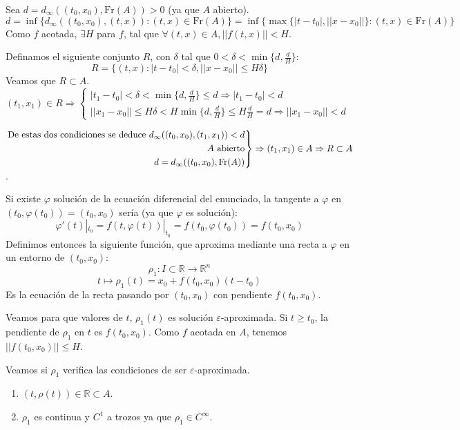 \documentclass[11pt, a4paper,twoside]{article}
\makeatletter
\theoremstyle{theorem-style}  %
\renewenvironment{proof}[1][\proofname]{\par
	\pushQED{\qed}%
	\normalfont \topsep6\p@\@plus6\p@\relax
	\list{}{%
		\settowidth{\leftmargin}{\quad:\hskip\labelsep}%
		\setlength{\labelwidth}{0pt}%
		\setlength{\itemindent}{-\leftmargin}%
	}%
	\item[\hskip\labelsep\itshape#1\@addpunct{:}]\ignorespaces
}{%
	\popQED\endlist\@endpefalse
}
\theoremstyle{definition-style}
\theoremstyle{example-style}
\newenvironment{rcases}
{\left.\begin{aligned}}
	{\end{aligned}\right\rbrace}
\makeatother
\begin{document}
\begin{proof}
	Sea $ d=d_\infty((t_0, x_0), \text{Fr} (A))>0 $ (ya que $ A $ abierto).
	\[ d=\inf \{d_\infty ( (t_0,x_0), (t,x)):(t,x)\in \text{Fr} (A) \}=\inf \{\max \{|t-t_0|,||x-x_0||\}:(t,x)\in \text{Fr} (A)\}\]
	Como $ f $ acotada, $ \exists H $ para $ f $, tal que $ \forall(t,x) \in A, ||f(t,x)||<H $.
	
	Definamos el siguiente conjunto $ R $, con $ \delta $ tal que $ 0<\delta<\min \{d, \frac{d}{H}\} $:
	\[ R=\{(t,x):|t-t_0|<\delta, ||x-x_0||\leq H\delta\} \]
	Veamos que $ R \subset A $. $ (t_1,x_1)\in R \Rightarrow \begin{cases}
	|t_1-t_0|<\delta<\min\{d,\frac{d}{H}\}\leq d\Rightarrow |t_1-t_0|<d\\
	||x_1-x_0||\leq H\delta<H\min\{d,\frac{d}{H}\}\leq H \frac{d}{H}=d \Rightarrow ||x_1-x_0||<d
	\end{cases}$  
	
	$\begin{rcases}
	\text{De estas dos condiciones se deduce } d_\infty ( (t_0,x_0), (t_1,x_1)) <d\\
	A \text{ abierto}\\
	d=d_\infty((t_0, x_0), \text{Fr} (A))
	\end{rcases} \Rightarrow (t_1,x_1)\in A \Rightarrow R \subset A$.
	
	Si existe $ \varphi $ solución de la ecuación diferencial del enunciado, la tangente a $ \varphi $ en $ (t_0,\varphi(t_0))=(t_0,x_0) $ sería (ya que $ \varphi $ es solución):
	\[ \varphi'(t)|_{t_0}=f(t, \varphi(t))|_{t_0}=f(t_0,\varphi (t_0))=f(t_0,x_0) \]
	Definimos entonces la siguiente función, que aproxima mediante una recta a $ \varphi $ en un entorno de $ (t_0,x_0) $: 
	\[ \rho_1:I\subset \mathbb{R}\longrightarrow \mathbb{R}^n \]
	\[ t \mapsto \rho_1(t)=x_0+f(t_0,x_0)(t-t_0) \]
	Es la ecuación de la recta pasando por $ (t_0,x_0) $ con pendiente $ f(t_0,x_0) $.
	
	Veamos para que valores de $ t $, $ \rho_1(t) $ es solución $ \varepsilon $-aproximada. 
	Si $ t\geq t_0 $, la pendiente de $ \rho_1 $ en $ t $ es $ f(t_0,x_0) $.
	Como $ f $ acotada en $ A $, tenemos $ ||f(t_0,x_0)||\leq H $.
	
	Veamos si $ \rho_1 $ verifica las condiciones de ser $ \varepsilon $-aproximada.
	\begin{enumerate}[\qquad i)]
		\item  $ (t,\rho(t)) \in \mathbb{R}\subset A$.
		
		\item $ \rho_1 $ es continua y $ C^1 $ a trozos ya que $ \rho_1 \in C^\infty $.
		

\end{enumerate}
\end{proof}
\end{document}

